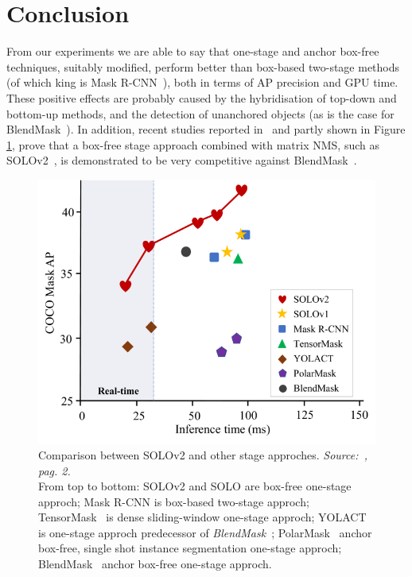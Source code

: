\documentclass[10pt,twocolumn,letterpaper]{article}
\begin{document}
\section{Conclusion}
From our experiments we are able to say that one-stage and anchor box-free techniques, suitably modified, perform better than box-based two-stage methods (of which king is Mask R-CNN~\cite{Authors1_maskrcnn}), both in terms of AP precision and GPU time. These positive effects are probably caused by the hybridisation of top-down and bottom-up methods, and the detection of unanchored objects (as is the case for BlendMask~\cite{Authors2_BlendMask}). In addition, recent studies reported in~\cite{Authors6_SOLOv2} and partly shown in Figure \ref{fig:conclusionSOLOv2}, prove that a box-free stage approach combined with matrix NMS, such as SOLOv2~\cite{Authors6_SOLOv2}, is demonstrated to be very competitive against BlendMask~\cite{Authors2_BlendMask}.
\begin{figure}[H]
\centering
  \includegraphics[width=0.7\linewidth]{./image/conclusion_SOLOv2.png}
  \caption{Comparison between SOLOv2 and other stage approches. \textit{Source:~\cite{Authors6_SOLOv2}, pag. 2.}\\ From top to bottom: SOLOv2\cite{Authors6_SOLOv2} and SOLO\cite{solo} are box-free one-stage approch; Mask R-CNN is box-based two-stage approch; TensorMask~\cite{tensormask} is dense sliding-window one-stage approch; YOLACT~\cite{yolact} is one-stage approch predecessor of \textit{BlendMask}~\cite{Authors2_BlendMask}; PolarMask~\cite{polarmask} anchor box-free, single shot instance segmentation one-stage approch; BlendMask~\cite{Authors2_BlendMask} anchor box-free one-stage approch.}
  \label{fig:conclusionSOLOv2}
\noindent
\end{figure}
\end{document}
